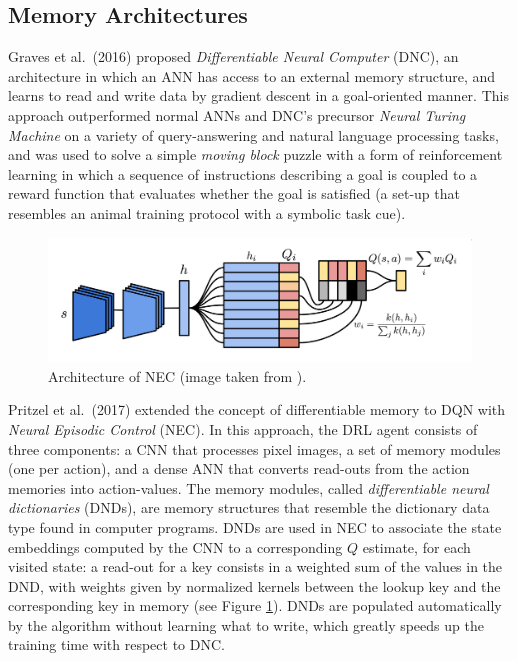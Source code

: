 \subsection{Memory Architectures} \label{s:memory}
Graves et al.\ (2016) \cite{graves2016hybrid} proposed \textit{Differentiable 
Neural Computer} (DNC), an architecture in which an ANN has access to an 
external memory structure, and learns to read and write data by gradient descent
in a goal-oriented manner.
This approach outperformed normal ANNs and DNC's precursor \textit{Neural 
Turing Machine} \cite{gravesneural} on a variety of query-answering and natural 
language processing tasks, and was used to solve a simple \textit{moving block} 
puzzle with a form of reinforcement learning in which a sequence of instructions
describing a goal is coupled to a reward function that evaluates whether the 
goal is satisfied (a set-up that resembles an animal training protocol with a 
symbolic task cue).
%
\begin{figure}
    \includegraphics[width=\textwidth]{pictures/nec}
    \centering
    \caption[Architecture of NEC]{Architecture of NEC (image taken from 
				\cite{pritzel2017neural}).}
\label{f:nec}
\end{figure}
%

Pritzel et al.\ (2017) \cite{pritzel2017neural} extended the concept of 
differentiable memory to DQN with \textit{Neural Episodic Control} (NEC). 
In this approach, the DRL agent consists of three components: a CNN that 
processes pixel images, a set of memory modules (one per action), and a dense 
ANN that converts read-outs from the action memories into action-values. The 
memory modules, called \textit{differentiable neural dictionaries} (DNDs), are 
memory structures that resemble the dictionary data type found in computer 
programs. DNDs are used in NEC to associate the state embeddings computed by the
CNN to a corresponding $Q$ estimate, for each visited state: a read-out for a 
key consists in a weighted sum of the values in the DND, with weights given by 
normalized kernels between the lookup key and the corresponding key in memory 
(see Figure \ref{f:nec}). 
DNDs are populated automatically by the algorithm without learning what to write,
which greatly speeds up the training time with respect to DNC.

